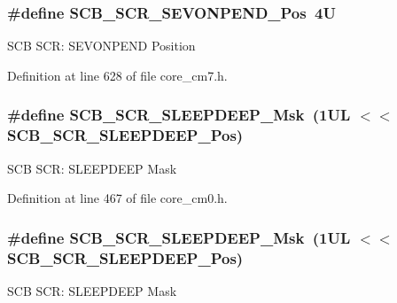 \subsubsection[{\texorpdfstring{S\+C\+B\+\_\+\+S\+C\+R\+\_\+\+S\+E\+V\+O\+N\+P\+E\+N\+D\+\_\+\+Pos}{SCB_SCR_SEVONPEND_Pos}}]{\setlength{\rightskip}{0pt plus 5cm}\#define S\+C\+B\+\_\+\+S\+C\+R\+\_\+\+S\+E\+V\+O\+N\+P\+E\+N\+D\+\_\+\+Pos~4U}\hypertarget{group___c_m_s_i_s___s_c_b_ga3bddcec40aeaf3d3a998446100fa0e44}{}\label{group___c_m_s_i_s___s_c_b_ga3bddcec40aeaf3d3a998446100fa0e44}
S\+CB S\+CR\+: S\+E\+V\+O\+N\+P\+E\+ND Position 

Definition at line 628 of file core\+\_\+cm7.\+h.

\subsubsection[{\texorpdfstring{S\+C\+B\+\_\+\+S\+C\+R\+\_\+\+S\+L\+E\+E\+P\+D\+E\+E\+P\+\_\+\+Msk}{SCB_SCR_SLEEPDEEP_Msk}}]{\setlength{\rightskip}{0pt plus 5cm}\#define S\+C\+B\+\_\+\+S\+C\+R\+\_\+\+S\+L\+E\+E\+P\+D\+E\+E\+P\+\_\+\+Msk~(1\+U\+L $<$$<$ S\+C\+B\+\_\+\+S\+C\+R\+\_\+\+S\+L\+E\+E\+P\+D\+E\+E\+P\+\_\+\+Pos)}\hypertarget{group___c_m_s_i_s___s_c_b_ga77c06a69c63f4b3f6ec1032e911e18e7}{}\label{group___c_m_s_i_s___s_c_b_ga77c06a69c63f4b3f6ec1032e911e18e7}
S\+CB S\+CR\+: S\+L\+E\+E\+P\+D\+E\+EP Mask 

Definition at line 467 of file core\+\_\+cm0.\+h.

\subsubsection[{\texorpdfstring{S\+C\+B\+\_\+\+S\+C\+R\+\_\+\+S\+L\+E\+E\+P\+D\+E\+E\+P\+\_\+\+Msk}{SCB_SCR_SLEEPDEEP_Msk}}]{\setlength{\rightskip}{0pt plus 5cm}\#define S\+C\+B\+\_\+\+S\+C\+R\+\_\+\+S\+L\+E\+E\+P\+D\+E\+E\+P\+\_\+\+Msk~(1\+U\+L $<$$<$ S\+C\+B\+\_\+\+S\+C\+R\+\_\+\+S\+L\+E\+E\+P\+D\+E\+E\+P\+\_\+\+Pos)}\hypertarget{group___c_m_s_i_s___s_c_b_ga77c06a69c63f4b3f6ec1032e911e18e7}{}\label{group___c_m_s_i_s___s_c_b_ga77c06a69c63f4b3f6ec1032e911e18e7}
S\+CB S\+CR\+: S\+L\+E\+E\+P\+D\+E\+EP Mask 

